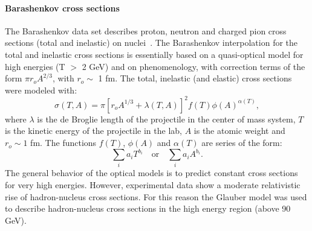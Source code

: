 \paragraph{Barashenkov cross sections}
The Barashenkov data set describes proton, neutron and charged pion cross 
sections (total and inelastic) on nuclei~\cite{hadbib:bar90,hadbib:bar89}. 
The Barashenkov interpolation for the total and inelastic cross sections is
essentially based on a quasi-optical model for high energies (T$\,\,>\,\,$2 GeV)
and on phenomenology, with correction terms of the form $\pi r_o A^{2/3}$, 
with $r_o\sim\,\,$1 fm.  The total, inelastic (and elastic) cross sections were
modeled with:
\[
\sigma(T,A)=\pi \left[r_{o}A^{1/3}+\lambda(T,A)\right]^{2}f(T)\phi(A)^{\alpha(T)},
\]
where $\lambda$ is the de Broglie length of the projectile in the center of 
mass system, $T$ is the kinetic energy of the projectile in the lab, $A$ is the 
atomic weight and $r_{o}\sim 1\,\,$fm. 
The functions $f(T)$, $\phi(A)$ and $\alpha(T)$ are series of the form:
\[
\sum_i a_i T^{b_i}\quad\textrm{or}\quad \sum_i a_i A^{b_i}.
\]
The general behavior of the optical models is to predict constant cross sections
for very high energies.  However, experimental data show a moderate relativistic 
rise of hadron-nucleus cross sections.  For this reason the Glauber model was
used to describe hadron-nucleus cross sections in the high energy region (above
90 GeV).
